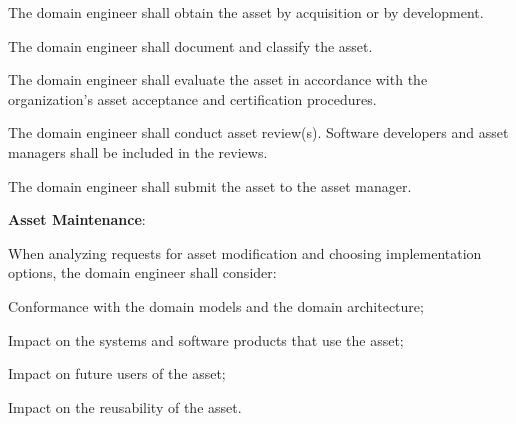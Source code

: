\begin{adjustwidth}{2em}{0pt}
\begin{compactenum}
					\begin{compactenum}

						\item The domain engineer shall obtain the asset by acquisition or by development.

						\item The domain engineer shall document and classify the asset.

						\item The domain engineer shall evaluate the asset in accordance with the organization’s asset acceptance and certification procedures.

						\item The domain engineer shall conduct asset review(s). Software developers and asset managers shall be included in the reviews.

						\item The domain engineer shall submit the asset to the asset manager.

					\end{compactenum}

					\item {\bf Asset Maintenance}:

					\begin{compactenum}

						\item When analyzing requests for asset modification and choosing implementation options, the domain engineer shall consider:

						\begin{compactenum}

							\item Conformance with the domain models and the domain architecture;

							\item Impact on the systems and software products that use the asset;

							\item Impact on future users of the asset;

							\item Impact on the reusability of the asset.

						\end{compactenum}

					\end{compactenum}

				\end{compactenum}

			\end{adjustwidth}

